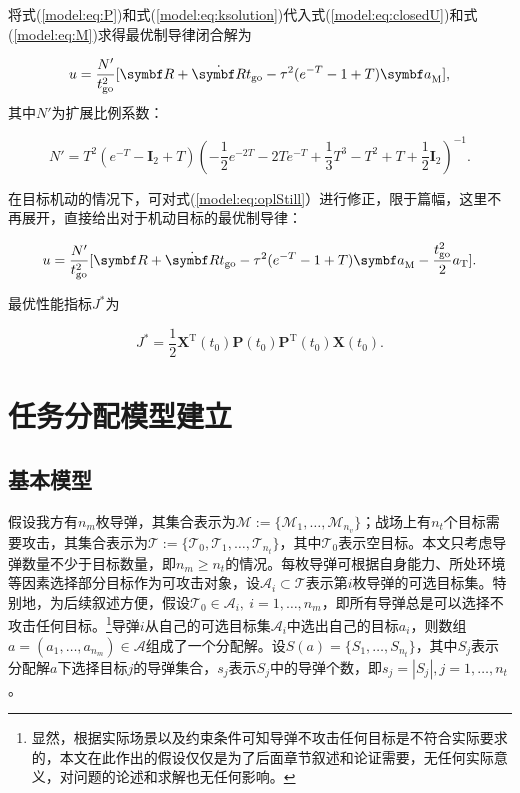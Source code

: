 将式(\ref{model:eq:P})和式(\ref{model:eq:ksolution})代入式(\ref{model:eq:closedU})和式(\ref{model:eq:M})求得最优制导律闭合解为

\begin{equation}
\label{model:eq:oplStill}
	u = \frac{N'}{t_{\text{go}}^2} [ \bm R+\dot{\bm R}t_{\text{go}} - \tau^2(e^{-T}-1+T) {\bm a}_{\text M}],
\end{equation}
其中$N'$为扩展比例系数：

\begin{equation}
\label{model:eq:oplparameters}
	N' = T^2 (e^{-T}-{\bm I}_2+T) (-\frac{1}{2}e^{-2T} - 2Te^{-T} + \frac{1}{3}T^3 - T^2 + T + \frac{1}{2}{\bm I}_2)^{-1}.
\end{equation}

在目标机动的情况下，可对式(\ref{model:eq:oplStill}）进行修正，限于篇幅，这里不再展开，直接给出对于机动目标的最优制导律：

\begin{equation}
\label{model:eq:oplMove}
	u = \frac{N'}{t_{\text{go}}^2} [ \bm R+\dot{\bm R}t_{\text{go}} - \tau^2(e^{-T}-1+T) {\bm a}_{\text M}-\frac{t_{\text{go}}^2}{2}a_{\text T}].
\end{equation}

最优性能指标$J^*$为

\begin{equation}
\label{model:eq:Jstar}
	J^* = \frac{1}{2} {\bm X}^{\mathrm T}(t_0) {\bm P}(t_0) {\bm P}^{\mathrm T}(t_0) {\bm X}(t_0).
\end{equation}

\section{任务分配模型建立}
\label{model:sec:assignment}

\subsection{基本模型}
\label{model:basic_model}

假设我方有$n_m$枚导弹，其集合表示为$\mathcal{M} := \{\mathcal{M}_1,\dots,\mathcal{M}_{n_v}\}$；战场上有$n_t$个目标需要攻击，其集合表示为$\mathcal{T} := \{\mathcal{T}_0,\mathcal{T}_1,\dots,\mathcal{T}_{n_t}\}$，其中$\mathcal{T}_0$表示空目标。本文只考虑导弹数量不少于目标数量，即$n_m \geq n_t$的情况。每枚导弹可根据自身能力、所处环境等因素选择部分目标作为可攻击对象，设$\mathcal{A}_i \subset \mathcal{T}$表示第$i$枚导弹的可选目标集。特别地，为后续叙述方便，假设$\mathcal{T}_0 \in \mathcal{A}_i,\ i=1,\dots,n_m$，即所有导弹总是可以选择不攻击任何目标。\footnote{显然，根据实际场景以及约束条件可知导弹不攻击任何目标是不符合实际要求的，本文在此作出的假设仅仅是为了后面章节叙述和论证需要，无任何实际意义，对问题的论述和求解也无任何影响。}导弹$i$从自己的可选目标集$\mathcal{A}_i$中选出自己的目标$a_i$，则数组$a=(a_1,\dots,a_{n_m})\in \mathcal{A}$组成了一个分配解。设$S(a)=\{S_1,\dots,S_{n_t}\}$，其中$S_j$表示分配解$a$下选择目标$j$的导弹集合，$s_j$表示$S_j$中的导弹个数，即$s_j = |S_j|, j=1,\dots,n_t$。


